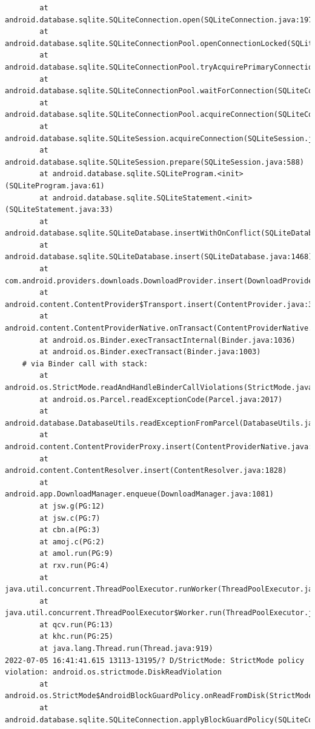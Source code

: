 \documentclass[a4paper,12pt]{book}
\begin{document}
\begin{lstlisting}
        at android.database.sqlite.SQLiteConnection.open(SQLiteConnection.java:197)
        at android.database.sqlite.SQLiteConnectionPool.openConnectionLocked(SQLiteConnectionPool.java:505)
        at android.database.sqlite.SQLiteConnectionPool.tryAcquirePrimaryConnectionLocked(SQLiteConnectionPool.java:949)
        at android.database.sqlite.SQLiteConnectionPool.waitForConnection(SQLiteConnectionPool.java:699)
        at android.database.sqlite.SQLiteConnectionPool.acquireConnection(SQLiteConnectionPool.java:380)
        at android.database.sqlite.SQLiteSession.acquireConnection(SQLiteSession.java:896)
        at android.database.sqlite.SQLiteSession.prepare(SQLiteSession.java:588)
        at android.database.sqlite.SQLiteProgram.<init>(SQLiteProgram.java:61)
        at android.database.sqlite.SQLiteStatement.<init>(SQLiteStatement.java:33)
        at android.database.sqlite.SQLiteDatabase.insertWithOnConflict(SQLiteDatabase.java:1597)
        at android.database.sqlite.SQLiteDatabase.insert(SQLiteDatabase.java:1468)
        at com.android.providers.downloads.DownloadProvider.insert(DownloadProvider.java:972)
        at android.content.ContentProvider$Transport.insert(ContentProvider.java:309)
        at android.content.ContentProviderNative.onTransact(ContentProviderNative.java:154)
        at android.os.Binder.execTransactInternal(Binder.java:1036)
        at android.os.Binder.execTransact(Binder.java:1003)
    # via Binder call with stack:
        at android.os.StrictMode.readAndHandleBinderCallViolations(StrictMode.java:2289)
        at android.os.Parcel.readExceptionCode(Parcel.java:2017)
        at android.database.DatabaseUtils.readExceptionFromParcel(DatabaseUtils.java:137)
        at android.content.ContentProviderProxy.insert(ContentProviderNative.java:481)
        at android.content.ContentResolver.insert(ContentResolver.java:1828)
        at android.app.DownloadManager.enqueue(DownloadManager.java:1081)
        at jsw.g(PG:12)
        at jsw.c(PG:7)
        at cbn.a(PG:3)
        at amoj.c(PG:2)
        at amol.run(PG:9)
        at rxv.run(PG:4)
        at java.util.concurrent.ThreadPoolExecutor.runWorker(ThreadPoolExecutor.java:1167)
        at java.util.concurrent.ThreadPoolExecutor$Worker.run(ThreadPoolExecutor.java:641)
        at qcv.run(PG:13)
        at khc.run(PG:25)
        at java.lang.Thread.run(Thread.java:919)
2022-07-05 16:41:41.615 13113-13195/? D/StrictMode: StrictMode policy violation: android.os.strictmode.DiskReadViolation
        at android.os.StrictMode$AndroidBlockGuardPolicy.onReadFromDisk(StrictMode.java:1571)
        at android.database.sqlite.SQLiteConnection.applyBlockGuardPolicy(SQLiteConnection.java:1138)

\end{lstlisting}
\end{document}
